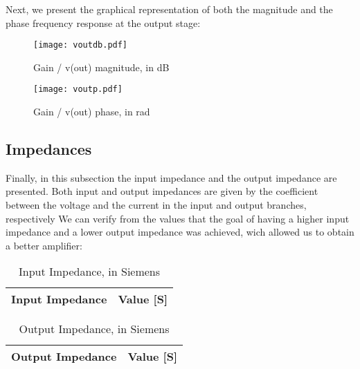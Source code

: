 \par Next, we present the graphical representation of both the magnitude and the phase frequency response at the output stage:\par
 

\begin{figure}[H] \centering
\texttt{[image: voutdb.pdf]}
\caption{Gain / v(out) magnitude, in dB}
\label{fig:voutdb}
\end{figure}

\begin{figure}[H] \centering
\texttt{[image: voutp.pdf]}
\caption{Gain / v(out) phase, in rad}
\label{fig:voutp}
\end{figure}


\subsection{Impedances}
\label{impedances}
Finally, in this subsection the input impedance and the output impedance are presented.
Both input and output impedances are given by the coefficient between the voltage and the current in the input and output branches, respectively
We can verify from the values that the goal of having a higher input impedance and a lower output impedance was achieved, wich allowed us to obtain a better amplifier:


\begin{table}[H]
  \centering
  \begin{tabular}{|l|r|}
    \hline    
    {\bf Input Impedance} & {\bf Value [S]} \\ \hline
    
  \end{tabular}
  \caption{Input Impedance, in Siemens}
  \label{tab:input_z}
\end{table}


\begin{table}[H]
  \centering
  \begin{tabular}{|l|r|}
    \hline    
    {\bf Output Impedance} & {\bf Value [S]} \\ \hline
    
  \end{tabular}
  \caption{Output Impedance, in Siemens}
  \label{tab:output_z}
\end{table}




